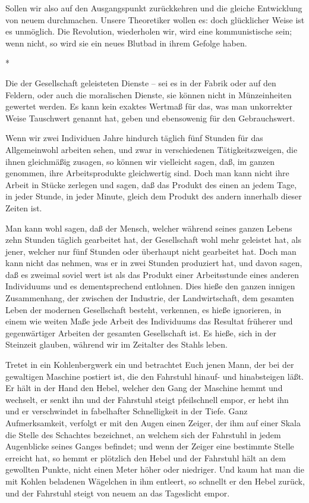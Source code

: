 \documentclass{scrbook}
\begin{document}
Sollen wir also auf den Ausgangspunkt zurückkehren und die gleiche Entwicklung von neuem durchmachen. Unsere Theoretiker wollen es: doch glücklicher Weise ist es unmöglich. Die Revolution, wiederholen wir, wird eine kommunistische sein; wenn nicht, so wird sie ein neues Blutbad in ihrem Gefolge haben.

\begin{center}*\end{center}

Die der Gesellschaft geleisteten Dienste – sei es in der Fabrik oder auf den Feldern, oder auch die moralischen Dienste, sie können nicht in Münzeinheiten gewertet werden. Es kann kein exaktes Wertmaß für das, was man unkorrekter Weise Tauschwert genannt hat, geben und ebensowenig für den Gebrauchswert.

Wenn wir zwei Individuen Jahre hindurch täglich fünf Stunden für das Allgemeinwohl arbeiten sehen, und zwar in verschiedenen Tätigkeitszweigen, die ihnen gleichmäßig zusagen, so können wir vielleicht sagen, daß, im ganzen genommen, ihre Arbeitsprodukte gleichwertig sind. Doch man kann nicht ihre Arbeit in Stücke zerlegen und sagen, daß das Produkt des einen an jedem Tage, in jeder Stunde, in jeder Minute, gleich dem Produkt des andern innerhalb dieser Zeiten ist.

Man kann wohl sagen, daß der Mensch, welcher während seines ganzen Lebens zehn Stunden täglich gearbeitet hat, der Gesellschaft wohl mehr geleistet hat, als jener, welcher nur fünf Stunden oder überhaupt nicht gearbeitet hat. Doch man kann nicht das nehmen, was er in zwei Stunden produziert hat, und davon sagen, daß es zweimal soviel wert ist als das Produkt einer Arbeitsstunde eines anderen Individuums und es dementsprechend entlohnen. Dies hieße den ganzen innigen Zusammenhang, der zwischen der Industrie, der Landwirtschaft, dem gesamten Leben der modernen Gesellschaft besteht, verkennen, es hieße ignorieren, in einem wie weiten Maße jede Arbeit des Individuums das Resultat früherer und gegenwärtiger Arbeiten der gesamten Gesellschaft ist. Es hieße, sich in der Steinzeit glauben, während wir im Zeitalter des Stahls leben.

Tretet in ein Kohlenbergwerk ein und betrachtet Euch jenen Mann, der bei der gewaltigen Maschine postiert ist, die den Fahrstuhl hinauf- und hinabsteigen läßt. Er hält in der Hand den Hebel, welcher den Gang der Maschine hemmt und wechselt, er senkt ihn und der Fahrstuhl steigt pfeilschnell empor, er hebt ihn und er verschwindet in fabelhafter Schnelligkeit in der Tiefe. Ganz Aufmerksamkeit, verfolgt er mit den Augen einen Zeiger, der ihm auf einer Skala die Stelle des Schachtes bezeichnet, an welchem sich der Fahrstuhl in jedem Augenblicke seines Ganges befindet; und wenn der Zeiger eine bestimmte Stelle erreicht hat, so hemmt er plötzlich den Hebel und der Fahrstuhl hält an dem gewollten Punkte, nicht einen Meter höher oder niedriger. Und kaum hat man die mit Kohlen beladenen Wägelchen in ihm entleert, so schnellt er den Hebel zurück, und der Fahrstuhl steigt von neuem an das Tageslicht empor.
\end{document}
